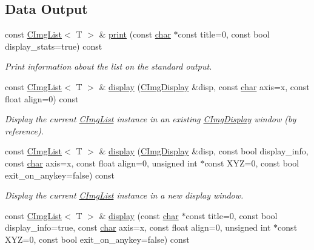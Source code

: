 \subsection*{Data Output}
\begin{DoxyCompactItemize}
\item 
const \hyperlink{structcimg__library__suffixed_1_1CImgList}{C\+Img\+List}$<$ T $>$ \& \hyperlink{structcimg__library__suffixed_1_1CImgList_a2ad854dec4e99ffe2db1bf551ac388b6}{print} (const \hyperlink{classchar}{char} $\ast$const title=0, const bool display\+\_\+stats=true) const
\begin{DoxyCompactList}\small\item\em Print information about the list on the standard output. \end{DoxyCompactList}\item 
const \hyperlink{structcimg__library__suffixed_1_1CImgList}{C\+Img\+List}$<$ T $>$ \& \hyperlink{structcimg__library__suffixed_1_1CImgList_a6d3f568606b4048412d8e61c947be6aa}{display} (\hyperlink{structcimg__library__suffixed_1_1CImgDisplay}{C\+Img\+Display} \&disp, const \hyperlink{classchar}{char} axis=\textquotesingle{}x\textquotesingle{}, const float align=0) const
\begin{DoxyCompactList}\small\item\em Display the current \hyperlink{structcimg__library__suffixed_1_1CImgList}{C\+Img\+List} instance in an existing \hyperlink{structcimg__library__suffixed_1_1CImgDisplay}{C\+Img\+Display} window (by reference). \end{DoxyCompactList}\item 
const \hyperlink{structcimg__library__suffixed_1_1CImgList}{C\+Img\+List}$<$ T $>$ \& \hyperlink{structcimg__library__suffixed_1_1CImgList_a99a0677786ba08ab5fef237089136c3b}{display} (\hyperlink{structcimg__library__suffixed_1_1CImgDisplay}{C\+Img\+Display} \&disp, const bool display\+\_\+info, const \hyperlink{classchar}{char} axis=\textquotesingle{}x\textquotesingle{}, const float align=0, unsigned int $\ast$const X\+YZ=0, const bool exit\+\_\+on\+\_\+anykey=false) const
\begin{DoxyCompactList}\small\item\em Display the current \hyperlink{structcimg__library__suffixed_1_1CImgList}{C\+Img\+List} instance in a new display window. \end{DoxyCompactList}\item 
const \hyperlink{structcimg__library__suffixed_1_1CImgList}{C\+Img\+List}$<$ T $>$ \& \hyperlink{structcimg__library__suffixed_1_1CImgList_ae94dcb99890c42df381d9ced1fefe901}{display} (const \hyperlink{classchar}{char} $\ast$const title=0, const bool display\+\_\+info=true, const \hyperlink{classchar}{char} axis=\textquotesingle{}x\textquotesingle{}, const float align=0, unsigned int $\ast$const X\+YZ=0, const bool exit\+\_\+on\+\_\+anykey=false) const

\end{DoxyCompactItemize}
